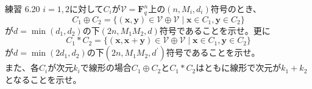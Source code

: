 \documentclass[dvipdfmx,10pt,jsarticle]{beamer}
\begin{document}
  \begin{frame}{練習 6.20}
    $i = 1, 2$に対して$C_i$が$\mathcal{V} = \mathbf{F}_q^n$上の$(n, M_i, d_i)$符号のとき、
    \[ C_1 \oplus C_2 = \lbrace(\mathbf{x} , \mathbf{y}) \in \mathcal{V} \oplus \mathcal{V} \mid \mathbf{x} \in C_1, \mathbf{y} \in C_2 \rbrace \]
    が$d = \min (d_1, d_2)$の下$(2n, M_1M_2, d)$符号であることを示せ。更に
    \[ C_1 \ast C_2 = \lbrace(\mathbf{x} , \mathbf{x} + \mathbf{y}) \in \mathcal{V} \oplus \mathcal{V} \mid \mathbf{x} \in C_1, \mathbf{y} \in C_2 \rbrace \]
    が$d = \min (2d_1, d_2)$の下$(2n, M_1M_2, d^\prime)$符号であることを示せ。\\
    また、各$C_i$が次元$k_i$で線形の場合$C_1 \oplus C_2$と$C_1 \ast C_2$はともに線形で次元が$k_1 + k_2$となることを示せ。
  \end{frame}
\end{document}
